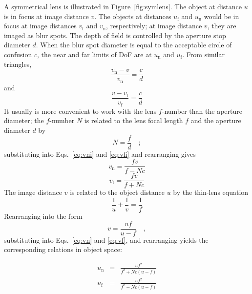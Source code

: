 \documentclass[11pt, oneside]{scrartcl}   	%
\begin{document}
A symmetrical lens is illustrated in Figure~\ref{fig:symlens}. The object at distance $u$ is in focus at image distance $v$. The objects at distances $u_\mathrm{f}$ and $u_\mathrm{n}$ would be in focus at image distances $v_\mathrm{f}$ and $v_\mathrm{n}$, respectively; at image distance $v$, they are imaged as blur spots. The depth of field is controlled by the aperture stop diameter $d$. When the blur spot diameter is equal to the acceptable circle of confusion $c$, the near and far limits of DoF are at $u_\mathrm{n}$ and $u_\mathrm{f}$. From similar triangles,
\begin{equation}
  \frac{v_\mathrm{n} - v}{v_\mathrm{n}} = \frac c d
  \label{eq:vni}
\end{equation}
and
\begin{equation}
  \frac{v - v_\mathrm{f}}{v_\mathrm{f}} = \frac c d
  \label{eq:vfi}
\end{equation}
It usually is more convenient to work with the lens $f$-number than the aperture diameter; the
 $f$-number $N$ is related to the lens focal length $f$ and the aperture diameter $d$ by 
 \begin{equation}
   N=\frac f d\quad ;
   \label{eq:N}
\end{equation}
  substituting into Eqs.~\ref{eq:vni} and \ref{eq:vfi} and rearranging gives
\begin{equation}
    v_\mathrm{n}=\frac{fv}{f -N c}
  \label{eq:vn}
\end{equation}
\begin{equation}
    v_\mathrm{f}=\frac{fv}{f + N\!c}
  \label{eq:vf}
\end{equation}
The image distance $v$ is related to the object distance $u$ by the thin-lens equation
\begin{equation}
   \frac1u+\frac1v=\frac1f
   \label{eq:thinlens}
\end{equation}
Rearranging into the form 
 \begin{equation}
v=\frac{uf}{u-f}\quad,
\end{equation}
substituting into Eqs.~\ref{eq:vn} and \ref{eq:vf}, and rearranging yields the corresponding relations in object space:

\begin{eqnarray}
u_\mathrm{n}&=&\frac{uf^2}{f^2 + N\!c(u-f)}\label{eq:un:os}\\
u_\mathrm{f}&=&\frac{uf^2}{f^2 - N\!c(u-f)}\label{eq:uf:os}
   \label{eq:unf}
\end{eqnarray}
\end{document}
